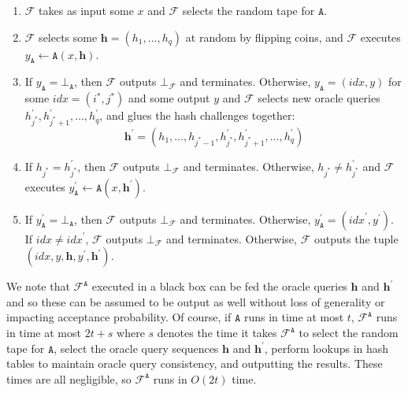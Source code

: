 \documentclass{mrl}
\theoremstyle{plain}
\theoremstyle{definition}
\begin{document}
\begin{enumerate}
\item $\mathcal{F}$ takes as input some $x$ and $\mathcal{F}$ selects the random tape for $\texttt{A}$.
\item $\mathcal{F}$ selects some $\textbf{h} = (h_1, \ldots, h_q)$ at random by flipping coins, and $\mathcal{F}$ executes $y_\texttt{A} \leftarrow \texttt{A}(x,\textbf{h})$.
\item If $y_{\texttt{A}} = \bot_{\texttt{A}}$, then $\mathcal{F}$ outputs $\bot_{\mathcal{F}}$ and terminates. Otherwise, $y_{\texttt{A}} = (\textit{idx}, y)$ for some $\textit{idx}=(i^*,j^*)$ and some output $y$ and $\mathcal{F}$ selects new oracle queries $h_{j^*}^\prime, h_{j^*+1}^\prime, \ldots, h_q^\prime$, and glues the hash challenges together: $$\textbf{h}^\prime = (h_1, \ldots, h_{j^*-1}, h_{j^*}^\prime, h_{j^*+1}^\prime, \ldots, h_q^\prime)$$
\item If $h_{j^*} = h_{j^{*}}^\prime$, then $\mathcal{F}$ outputs $\bot_{\mathcal{F}}$ and terminates. Otherwise, $h_{j^*} \neq h_{j^{*}}^\prime$ and $\mathcal{F}$ executes $y_\texttt{A}^\prime \leftarrow \texttt{A}(x,\textbf{h}^\prime)$.
\item If $y_{\texttt{A}}^\prime = \bot_{\texttt{A}}$, then $\mathcal{F}$ outputs $\bot_{\mathcal{F}}$ and terminates. Otherwise, $y_{\texttt{A}}^\prime = (\textit{idx}^{\prime}, y^\prime)$. If $\textit{idx} \neq \textit{idx}^\prime$, $\mathcal{F}$ outputs $\bot_{\mathcal{F}}$ and terminates. Otherwise, $\mathcal{F}$ outputs the tuple $(\textit{idx}, y, \textbf{h}, y^\prime, \textbf{h}^\prime)$.
\end{enumerate}

We note that $\mathcal{F}^{\texttt{A}}$ executed in a black box can be fed the oracle queries $\textbf{h}$ and $\textbf{h}^\prime$ and so these can be assumed to be output as well without loss of generality or impacting acceptance probability. Of course, if $\texttt{A}$ runs in time at most $t$, $\mathcal{F}^{\texttt{A}}$ runs in time at most $2t+s$ where $s$ denotes the time it takes $\mathcal{F}^{\texttt{A}}$ to select the random tape for $\texttt{A}$, select the oracle query sequences $\textbf{h}$ and $\textbf{h}^\prime$, perform lookups in hash tables to maintain oracle query consistency, and outputting the results. These times are all negligible, so $\mathcal{F}^{\texttt{A}}$ runs in $O(2t)$ time.
\end{document}
